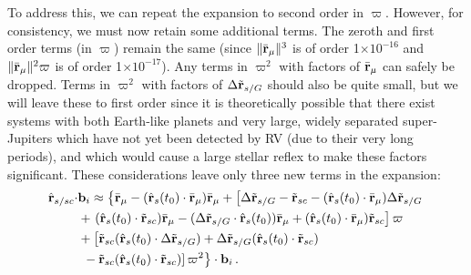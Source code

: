 To address this, we can repeat the expansion to second order in $\varpi$.  However, for consistency, we must now retain some additional terms.  The zeroth and first order terms (in $\varpi$) remain the same (since $\Vert \bar{\mathbf{r}}_\mu \Vert^3$ is of order 1$\times10^{-16}$ and  $\Vert \bar{\mathbf{r}}_\mu \Vert^2\varpi$ is of order 1$\times10^{-17}$).  Any terms in $\varpi^2$ with factors of $\bar{\mathbf{r}}_\mu$ can safely be dropped.  Terms in $\varpi^2$ with factors of $\Delta \tilde{\mathbf{r}}_{s/G}$ should also be quite small, but we will leave these to first order since it is theoretically possible that there exist systems with both Earth-like planets and very large, widely separated super-Jupiters which have not yet been detected by RV (due to their very long periods), and which would cause a large stellar reflex to make these factors significant.  These considerations leave only three new terms in the expansion:
\begin{equation}\label{eq:rhat_expand2}
\begin{split}
\hat{\mathbf{r}}_{s/sc}\cdot &\mathbf b_i \approx
\left\{\bar{\mathbf{r}}_\mu  - (\hat{\mathbf{r}}_s(t_0) \cdot \bar{\mathbf{r}}_\mu)\bar{\mathbf{r}}_\mu +  \left[\Delta \tilde{\mathbf{r}}_{s/G}  - \tilde {\mathbf{r}}_{sc}  -(\hat{\mathbf{r}}_s(t_0)\cdot\bar{\mathbf{r}}_\mu)\Delta \tilde{\mathbf{r}}_{s/G}\right.\right.\\
&{} + \left.(\hat{\mathbf{r}}_s(t_0) \cdot \tilde{\mathbf{r}}_{sc}) \bar{\mathbf{r}}_\mu - (\Delta\tilde{\mathbf{r}}_{s/G} \cdot \hat{\mathbf{r}}_s(t_0))\bar{\mathbf{r}}_\mu +(\hat{\mathbf{r}}_s(t_0)\cdot\bar{\mathbf{r}}_\mu)\tilde {\mathbf{r}}_{sc}\right]\varpi\\
&{} + \left[\tilde{\mathbf{r}}_{sc} (\hat{\mathbf{r}}_s(t_0) \cdot \Delta \tilde{\mathbf{r}}_{s/G}) + \Delta \tilde{\mathbf{r}}_{s/G} (\hat{\mathbf{r}}_s(t_0) \cdot \tilde{\mathbf{r}}_{sc}) \right.\\
&\left.\left.{} - \tilde{\mathbf{r}}_{sc} (\hat{\mathbf{r}}_s(t_0) \cdot \tilde{\mathbf{r}}_{sc})\right]\varpi^2\right\} \cdot \mathbf b_i \,.
\end{split}
\end{equation}

